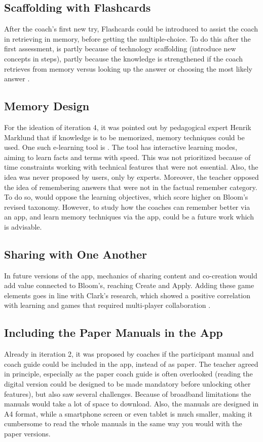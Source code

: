 \subsection{Scaffolding with Flashcards}
After the coach's first new try, Flashcards could be introduced to assist the coach in retrieving in memory, before getting the multiple-choice. To do this after the first assessment, is partly because of technology scaffolding (introduce new concepts in steps), partly because the knowledge is strengthened if the coach retrieves from memory versus looking up the answer or choosing the most likely answer \citep{bjork}.

\subsection{Memory Design}
For the ideation of iteration 4, it was pointed out by pedagogical expert Henrik Marklund that if knowledge is to be memorized, memory techniques could be used. One such e-learning tool is \cite{memorize}. The tool has interactive learning modes, aiming to learn facts and terms with speed. This was not prioritized because of time constraints working with technical features that were not essential. Also, the idea was never proposed by users, only by experts. Moreover, the teacher opposed the idea of remembering answers that were not in the factual remember category. To do so, would oppose the learning objectives, which score higher on Bloom's revised taxonomy. However, to study how the coaches can remember better via an app, and learn memory techniques via the app, could be a future work which is advisable.

\subsection{Sharing with One Another}

In future versions of the app, mechanics of sharing content and co-creation would add value connected to Bloom's, reaching Create and Apply. Adding these game elements goes in line with Clark's research, which showed a positive correlation with learning and games that required multi-player collaboration \citep{gates}.


\subsection{Including the Paper Manuals in the App}

Already in iteration 2, it was proposed by coaches if the participant manual and coach guide could be included in the app, instead of as paper. The teacher agreed in principle, especially as the paper coach guide is often overlooked (reading the digital version could be designed to be made mandatory before unlocking other features), but also saw several challenges.  Because of broadband limitations the manuals would take a lot of space to download. Also, the manuals are designed in A4 format, while a smartphone screen or even tablet is much smaller, making it cumbersome to read the whole manuals in the same way you would with the paper versions.

